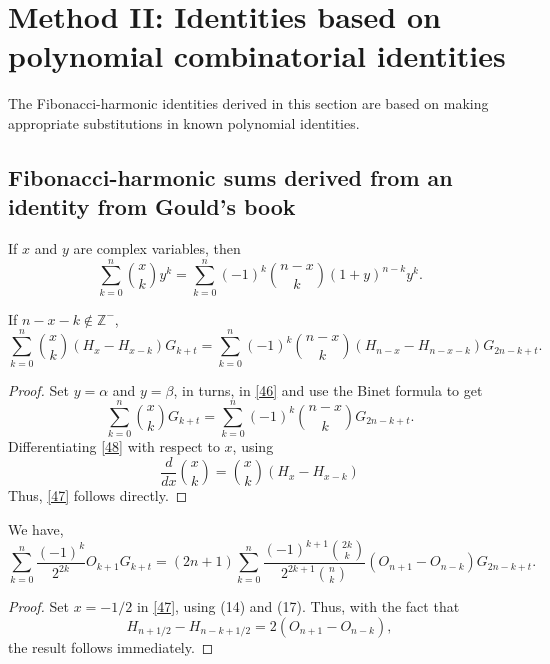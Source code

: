 \documentclass[12pt,reqno]{article}
\begin{document}
	\section{Method II: Identities based on polynomial combinatorial identities}
	
	The Fibonacci-harmonic identities derived in this section are based on making appropriate substitutions in known polynomial identities.
	
	\subsection{Fibonacci-harmonic sums derived from an identity from Gould's book}
	
	\begin{lemma}
		If $x$ and $y$ are complex variables, then
		\begin{equation}\label{46}
		\sum_{k = 0}^n \binom{{x}}{k} y^k = \sum_{k = 0}^n \left( {- 1} \right)^k \binom{{n - x}}{k}\left( {1 + y} \right)^{n - k} y^k.
		\end{equation}
	\end{lemma}
	
	\begin{theorem}
		If $n-x-k\notin \mathbb{Z}^{-}$,
		\begin{equation}\label{47}
		\sum_{k=0}^n\binom{x}{k}(H_x-H_{x-k})G_{k+t} = \sum_{k=0}^n (-1)^k \binom{n-x}{k} (H_{n-x}-H_{n-x-k}) G_{2n-k+t}.
		\end{equation}
	\end{theorem}
	\begin{proof}
		Set $y=\alpha$ and $y=\beta$, in turns, in \eqref{46} and use the Binet formula to get
		\begin{equation}\label{48}
			\sum_{k=0}^n\binom{x}{k}G_{k+t} = \sum_{k=0}^n (-1)^k \binom{n-x}{k} G_{2n-k+t}.
		\end{equation}
		Differentiating \eqref{48} with respect to $x$, using
		$$\frac{d}{dx}\binom{x}{k}=\binom{x}{k}(H_x-H_{x-k})$$
		Thus, \eqref{47} follows directly.
	\end{proof}
	
	\begin{corollary}
	We have,
	\begin{equation}
	\sum_{k=0}^n \frac{(-1)^k}{2^{2k}} O_{k+1}G_{k+t}
	= (2n+1) \sum_{k=0}^n \frac{(-1)^{k+1} \binom{2k}{k}} {2^{2k+1}\binom{n}{k}}(O_{n+1}-O_{n-k})G_{2n-k+t}.
		\end{equation}
	\end{corollary}
	\begin{proof}
		Set $x=-1/2$ in \eqref{47}, using (14) and (17). Thus, with the fact that 
		$$H_{n+1/2}-H_{n-k+1/2}=2(O_{n+1}-O_{n-k}),$$
		the result follows immediately.
	\end{proof}
	
\end{document}
